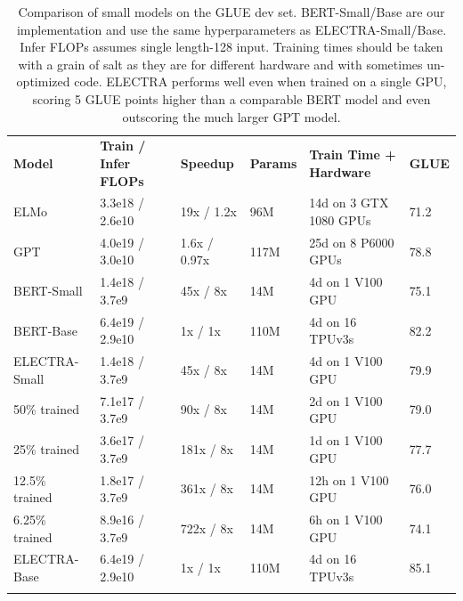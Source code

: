 \documentclass{article}
\newcommand\tstrut{\rule{0pt}{2.6ex}}
\newcommand\bstrut{\rule[-1.0ex]{0pt}{0pt}}
\newcommand{\thinline}{\Xhline{1.5\arrayrulewidth}}
\newcommand{\thickline}{\Xhline{2.5\arrayrulewidth}}
\newcommand{\tsep}	{\bstrut \\ \thinline}
\newcommand{\ttop}{\thickline}
\newcommand{\tbottom}{\bstrut \\ \thickline}
\begin{document}
\addtolength{\tabcolsep}{-1.2pt}
\begin{table}[t!]
\small
\begin{center}
\begin{tabularx}{\linewidth}{X l l l l l}
\ttop
\textbf{Model} & \textbf{Train / Infer FLOPs} & \textbf{Speedup} & \textbf{Params} & \textbf{Train Time + Hardware} & \textbf{GLUE} \tstrut \tsep
ELMo & 3.3e18 / 2.6e10  & 19x / 1.2x & 96M & 14d on 3 GTX 1080 GPUs & 71.2 \tstrut \\
GPT & 4.0e19 / 3.0e10 & 1.6x / 0.97x & 117M & 25d on 8 P6000 GPUs & 78.8 \\
BERT-Small & 1.4e18 / 3.7e9 & 45x / 8x  & 14M & 4d on 1 V100 GPU  & 75.1 \\
BERT-Base & 6.4e19 / 2.9e10 & 1x / 1x & 110M & 4d on 16 TPUv3s &  82.2 \tsep
ELECTRA-Small & 1.4e18 / 3.7e9 & 45x / 8x & 14M & 4d on 1 V100 GPU & 79.9 \tstrut \\
\hspace{3mm}50\% trained & 7.1e17 / 3.7e9 & 90x / 8x & 14M & 2d on 1 V100 GPU & 79.0 \\
\hspace{3mm}25\% trained & 3.6e17 / 3.7e9 & 181x / 8x & 14M & 1d on 1 V100 GPU & 77.7 \\
\hspace{3mm}12.5\% trained & 1.8e17 / 3.7e9 & 361x / 8x & 14M & 12h on 1 V100 GPU & 76.0 \\
\hspace{3mm}6.25\% trained & 8.9e16 / 3.7e9 & 722x / 8x & 14M & 6h on 1 V100 GPU & 74.1 \\
ELECTRA-Base & 6.4e19 / 2.9e10 & 1x / 1x & 110M & 4d on 16 TPUv3s & 85.1 \tbottom
\end{tabularx} 
\end{center}
\vspace{-1mm}
\caption{Comparison of small models on the GLUE dev set.
BERT-Small/Base are our implementation and use the same hyperparameters as ELECTRA-Small/Base. 
Infer FLOPs assumes single length-128 input. 
Training times should be taken with a grain of salt as they are for different hardware and with sometimes un-optimized code.
ELECTRA performs well even when trained on a single GPU, scoring 5 GLUE points higher than a comparable BERT model and even outscoring the much larger GPT model.
}
\label{tab:small}
\end{table}
\addtolength{\tabcolsep}{1.2pt}
\vspace{-0.0mm}
\end{document}
